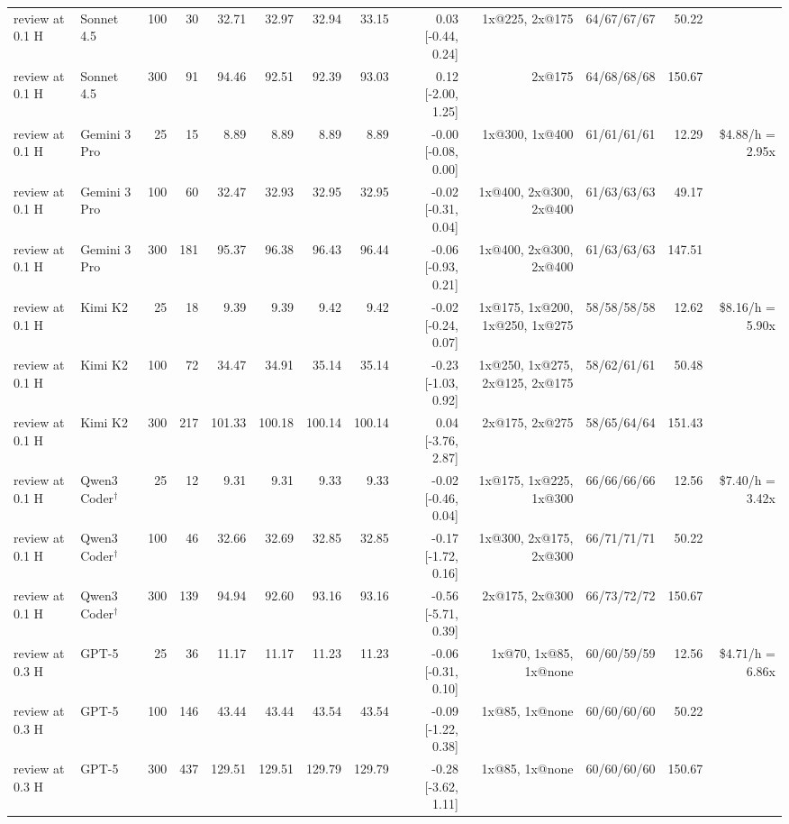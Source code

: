 \begin{table}[t]
\begin{tabular}{llrrrrrrrrrrr}
review at 0.1 H & Sonnet 4.5 & 100 & 30 & 32.71 & 32.97 & 32.94 & 33.15 & 0.03 [-0.44, 0.24] & 1x@225, 2x@175 & 64/67/67/67 & 50.22 &  \\
review at 0.1 H & Sonnet 4.5 & 300 & 91 & 94.46 & 92.51 & 92.39 & 93.03 & 0.12 [-2.00, 1.25] & 2x@175 & 64/68/68/68 & 150.67 &  \\
review at 0.1 H & Gemini 3 Pro & 25 & 15 & 8.89 & 8.89 & 8.89 & 8.89 & -0.00 [-0.08, 0.00] & 1x@300, 1x@400 & 61/61/61/61 & 12.29 & \$4.88/h = 2.95x \\
review at 0.1 H & Gemini 3 Pro & 100 & 60 & 32.47 & 32.93 & 32.95 & 32.95 & -0.02 [-0.31, 0.04] & 1x@400, 2x@300, 2x@400 & 61/63/63/63 & 49.17 &  \\
review at 0.1 H & Gemini 3 Pro & 300 & 181 & 95.37 & 96.38 & 96.43 & 96.44 & -0.06 [-0.93, 0.21] & 1x@400, 2x@300, 2x@400 & 61/63/63/63 & 147.51 &  \\
review at 0.1 H & Kimi K2 & 25 & 18 & 9.39 & 9.39 & 9.42 & 9.42 & -0.02 [-0.24, 0.07] & 1x@175, 1x@200, 1x@250, 1x@275 & 58/58/58/58 & 12.62 & \$8.16/h = 5.90x \\
review at 0.1 H & Kimi K2 & 100 & 72 & 34.47 & 34.91 & 35.14 & 35.14 & -0.23 [-1.03, 0.92] & 1x@250, 1x@275, 2x@125, 2x@175 & 58/62/61/61 & 50.48 &  \\
review at 0.1 H & Kimi K2 & 300 & 217 & 101.33 & 100.18 & 100.14 & 100.14 & 0.04 [-3.76, 2.87] & 2x@175, 2x@275 & 58/65/64/64 & 151.43 &  \\
review at 0.1 H & Qwen3 Coder$^\dagger$ & 25 & 12 & 9.31 & 9.31 & 9.33 & 9.33 & -0.02 [-0.46, 0.04] & 1x@175, 1x@225, 1x@300 & 66/66/66/66 & 12.56 & \$7.40/h = 3.42x \\
review at 0.1 H & Qwen3 Coder$^\dagger$ & 100 & 46 & 32.66 & 32.69 & 32.85 & 32.85 & -0.17 [-1.72, 0.16] & 1x@300, 2x@175, 2x@300 & 66/71/71/71 & 50.22 &  \\
review at 0.1 H & Qwen3 Coder$^\dagger$ & 300 & 139 & 94.94 & 92.60 & 93.16 & 93.16 & -0.56 [-5.71, 0.39] & 2x@175, 2x@300 & 66/73/72/72 & 150.67 &  \\
\midrule
review at 0.3 H & GPT-5 & 25 & 36 & 11.17 & 11.17 & 11.23 & 11.23 & -0.06 [-0.31, 0.10] & 1x@70, 1x@85, 1x@none & 60/60/59/59 & 12.56 & \$4.71/h = 6.86x \\
review at 0.3 H & GPT-5 & 100 & 146 & 43.44 & 43.44 & 43.54 & 43.54 & -0.09 [-1.22, 0.38] & 1x@85, 1x@none & 60/60/60/60 & 50.22 &  \\
review at 0.3 H & GPT-5 & 300 & 437 & 129.51 & 129.51 & 129.79 & 129.79 & -0.28 [-3.62, 1.11] & 1x@85, 1x@none & 60/60/60/60 & 150.67 &  \\

\end{tabular}
\end{table}
